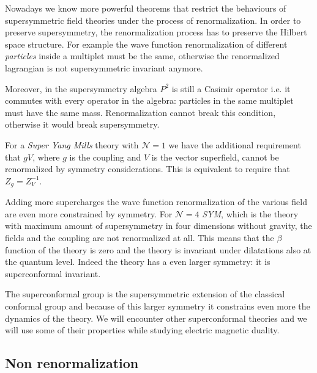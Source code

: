 Nowadays we know more powerful theorems that restrict the behaviours of supersymmetric field theories under the process of renormalization.
In order to preserve supersymmetry, the renormalization process has to preserve the Hilbert space structure. For example the wave function renormalization of different \emph{ particles} inside a multiplet must be the same, otherwise the renormalized lagrangian is not supersymmetric invariant anymore. 

Moreover, in the supersymmetry algebra $P^2$ is still a Casimir operator i.e. it commutes with every operator in the algebra: particles in the same multiplet must have the same mass.
Renormalization cannot break this condition, otherwise it would break supersymmetry.

For a \emph{Super Yang Mills} theory with $\mathcal{N} = 1$ we have the additional requirement that $g V$, where $g$ is the coupling and $V$ is the vector superfield, cannot be renormalized by symmetry considerations. This is equivalent to require that 
$ Z_g = Z_V^{-1}$.

Adding more supercharges the wave function renormalization of the various field are even more constrained by symmetry.
For $\mathcal{N}=4$ \emph{SYM}, which is the  theory with maximum amount of supersymmetry in four dimensions without gravity, the fields and the coupling are not renormalized at all.
This means that the $\beta$ function of the theory is zero and the theory is invariant under dilatations also at the quantum level.
Indeed the theory has a even larger symmetry: it is superconformal invariant.

The superconformal group is the supersymmetric extension of the classical conformal group and because of this larger symmetry it constrains even more the dynamics of the theory. 
We will encounter other superconformal theories and we will use some of their properties while studying electric magnetic duality. 


\subsection{Non renormalization}








\newpage